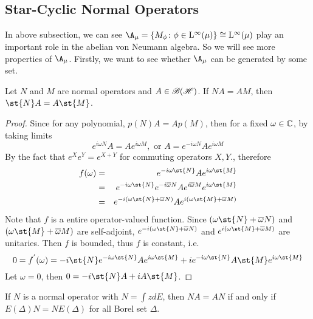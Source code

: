 \subsection{Star-Cyclic Normal Operators}

In above subsection, we can see $\A_{\mu} = \{M_{\phi} \colon \phi \in \lfs{\infty}(\mu)\} \cong \lfs{\infty}(\mu)$ play an important role in the abelian von Neumann algebra. So we will see more properties of $\A_{\mu}$. Firstly, we want to see whether $\A_{\mu}$ can be generated by some set. 

\begin{thm}
	Let $N$ and $M$ are normal operators and $A \in \mathscr{B(H)}$. If $NA = AM$, then $\st{N}A = A\st{M}$.
\end{thm}
\begin{proof}
	Since for any polynomial, $p(N)A=Ap(M)$, then for a fixed $\omega \in \mathbb{C}$, by taking limits
	\begin{equation*}
		e^{i\omega N}A = A e^{i\omega M}, \text{ or } A = e^{-i\omega N} A e^{i\omega M}
	\end{equation*}
	By the fact that $e^{X}e^{Y} = e^{X+Y}$ for commuting operators $X,Y$., therefore
	\begin{eqnarray*}
		f(\omega) &=& e^{-i\omega \st{N}} A e^{i\omega \st{M}} \\
		&=& e^{-i\omega \st{N}} e^{-i\clo{\omega} N} A e^{i\clo{\omega} M} e^{i\omega \st{M}} \\
		&=& e^{-i(\omega \st{N}+\clo{\omega} N)} A e^{i(\omega \st{M}+\clo{\omega} M)}
	\end{eqnarray*}
	Note that $f$ is a entire operator-valued function. Since $(\omega \st{N}+\clo{\omega} N)$ and $(\omega \st{M}+\clo{\omega} M)$ are self-adjoint, $e^{-i(\omega \st{N}+\clo{\omega} N)}$ and $e^{i(\omega \st{M}+\clo{\omega} M)}$ are unitaries. Then $f$ is bounded, thus $f$ is constant, i.e.
	\begin{equation*}
		0 = f^{'}(\omega) = -i\st{N}e^{-i\omega \st{N}} A e^{i\omega \st{M}} + ie^{-i\omega \st{N}} A \st{M} e^{i\omega \st{M}}
	\end{equation*}
	Let $\omega = 0$, then $0=-i\st{N}A + iA\st{M}$.
\end{proof}

\begin{cor}
	If $N$ is a normal operator with $N = \int z dE$, then $NA=AN$ if and only if $E(\Delta)N=NE(\Delta)$ for all Borel set $\Delta$.
\end{cor}


